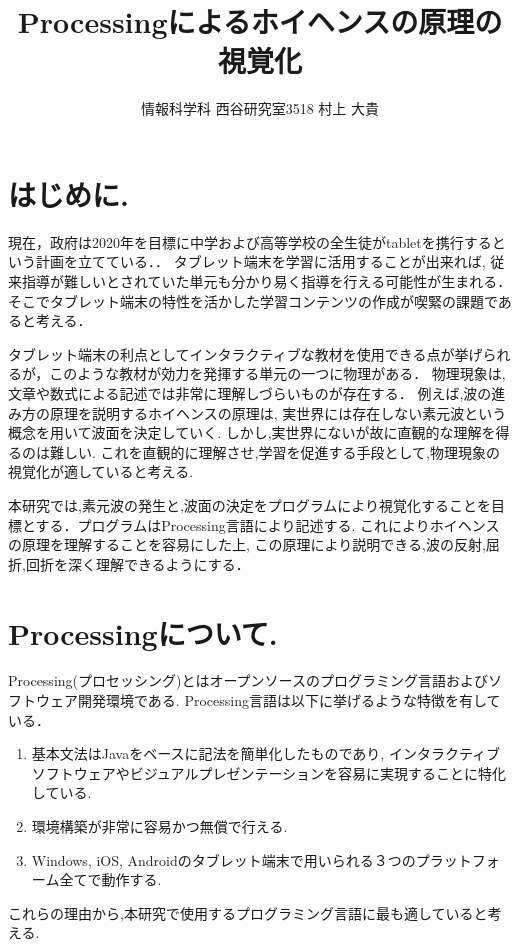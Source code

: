 \documentclass[a4j,twocolumn,uplatex]{jarticle}
\begin{document}
\title{Processingによるホイヘンスの原理の視覚化}
\author{情報科学科 西谷研究室3518 村上 大貴}
\date{}
\maketitle
\section{はじめに.}
現在，政府は2020年を目標に中学および高等学校の全生徒がtabletを携行するという計画を立てている．\cite{tablet}．
タブレット端末を学習に活用することが出来れば,
従来指導が難しいとされていた単元も分かり易く指導を行える可能性が生まれる．
そこでタブレット端末の特性を活かした学習コンテンツの作成が喫緊の課題であると考える．

タブレット端末の利点としてインタラクティブな教材を使用できる点が挙げられるが，このような教材が効力を発揮する単元の一つに物理がある．
物理現象は,文章や数式による記述では非常に理解しづらいものが存在する．
例えば,波の進み方の原理を説明するホイヘンスの原理は,
実世界には存在しない素元波という概念を用いて波面を決定していく.
しかし,実世界にないが故に直観的な理解を得るのは難しい.
これを直観的に理解させ,学習を促進する手段として,物理現象の視覚化が適していると考える.

本研究では,素元波の発生と,波面の決定をプログラムにより視覚化することを目標とする．プログラムはProcessing言語により記述する.
これによりホイヘンスの原理を理解することを容易にした上,
この原理により説明できる,波の反射,屈折,回折を深く理解できるようにする．
\vspace{-4mm}

\section{Processingについて.}
Processing(プロセッシング)とはオープンソースのプログラミング言語およびソフトウェア開発環境である.
Processing言語は以下に挙げるような特徴を有している\cite{ishikawa}．
\begin{enumerate}
\item 基本文法はJavaをベースに記法を簡単化したものであり,
インタラクティブソフトウェアやビジュアルプレゼンテーションを容易に実現することに特化している.
\item 環境構築が非常に容易かつ無償で行える.
\item Windows, iOS, Androidのタブレット端末で用いられる３つのプラットフォーム全てで動作する.
\end{enumerate}
これらの理由から,本研究で使用するプログラミング言語に最も適していると考える.
\vspace{-4mm}
\end{document}
